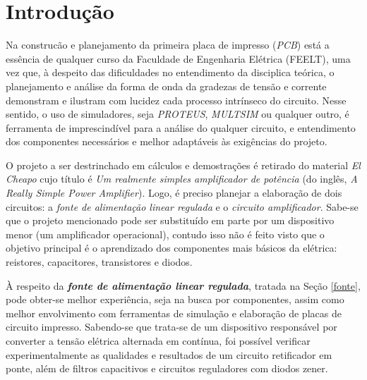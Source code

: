 \documentclass[a4paper,12pt,oneside,openany,table,xcdraw]{article}
\begin{document}
\newcommand{\thedepartment}{Faculdade de Engenharia Elétrica}
\newcommand{\thecourse}{FEELT}
\newcommand{\thetitle}{FONTE LINEAR REGULADA + CIRCUITO AMPLIFICADOR}
\newcommand{\thetype}{Relatório da Disciplina de Eletrônica Analógica I}
\newcommand{\theproftitle}{Bacharel em Engenharia Elétrica}
\newcommand{\thestudent}{Ana Júlia Costa Santana \_ 
11811ETE003\\Lesly Viviane Montúfar Berrios \_ 
11811ETE001}
\newcommand{\theadvisor}{Prof. Daniel Pereira de Carvalho}
\newcommand{\thecity}{Uberlândia}

\thispagestyle{empty}


\onehalfspacing
\tableofcontents %
\newpage

\section{Introdução}
Na construcão e planejamento da primeira placa de impresso (\emph{PCB}) está a essência de qualquer curso da Faculdade de Engenharia Elétrica (FEELT), uma vez que, à despeito das dificuldades no entendimento da disciplica teórica, o planejamento e análise da forma de onda da gradezas de tensão e corrente demonstram e ilustram com lucidez cada processo intrínseco do circuito. Nesse sentido, o uso de simuladores, seja \emph{PROTEUS}, \emph{MULTSIM} ou qualquer outro, é ferramenta de imprescindível para a análise do qualquer circuito, e entendimento dos componentes necessários e melhor adaptáveis às exigências do projeto.

O projeto a ser destrinchado em cálculos e demostrações é retirado do material \emph{El Cheapo} \cite{cheapo} cujo título é \emph{Um realmente simples amplificador de potência} (do inglês, \emph{A Really Simple Power Amplifier}). Logo, é preciso planejar a elaboração de dois circuitos: a \emph{fonte de alimentação linear regulada} e o \emph{circuito amplificador}. Sabe-se que o projeto mencionado pode ser substituído em parte por um dispositivo menor (um amplificador operacional), contudo isso não é feito visto que o objetivo principal é o aprendizado dos componentes mais básicos da elétrica: reistores, capacitores, transistores e diodos. %

À respeito da \textbf{\textit{fonte de alimentação linear regulada}}, tratada na Seção \ref{fonte}, pode obter-se melhor experiência, seja na busca por componentes, assim como melhor envolvimento com ferramentas de simulação e elaboração de placas de circuito impresso. Sabendo-se 
 que trata-se de um dispositivo responsável por converter a tensão elétrica alternada em contínua, foi possível verificar experimentalmente as qualidades e resultados de um circuito retificador em ponte, além de filtros capacitivos e circuitos reguladores com diodos zener.
\end{document}
